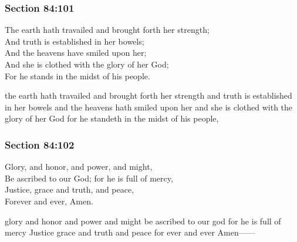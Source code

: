 	\subsubsection{Section 84:101} %
		\label{DC84-101}

		The earth hath travailed and brought forth her strength; \\ 
		And truth is established in her bowels;                  \\
		And the heavens have smiled upon her;                    \\
		And she is clothed with the glory of her God;            \\
		For he stands in the midst of his people.                \\

		\begin{framed}
		\scriptsize
			\begin{compactdesc}
				\item[JSP] the earth hath travailed and brought forth her strength and truth is established in her bowels and the heavens hath smiled upon her and she is clothed with the glory of her God for he standeth in the midst of his people,
			\end{compactdesc}
		\end{framed}

	\subsubsection{Section 84:102} %
		\label{DC84-102}

		Glory, and honor, and power, and might,			 \\ 
		Be ascribed to our God; for he is full of mercy, \\  
		Justice, grace and truth, and peace,             \\
		Forever and ever, Amen.                          \\

		\begin{framed}
		\scriptsize
			\begin{compactdesc}
				\item[JSP] glory and honor and power and might be ascribed to our god for he is full of mercy Justice grace and truth and peace for ever and ever Amen------
			\end{compactdesc}
		\end{framed}

